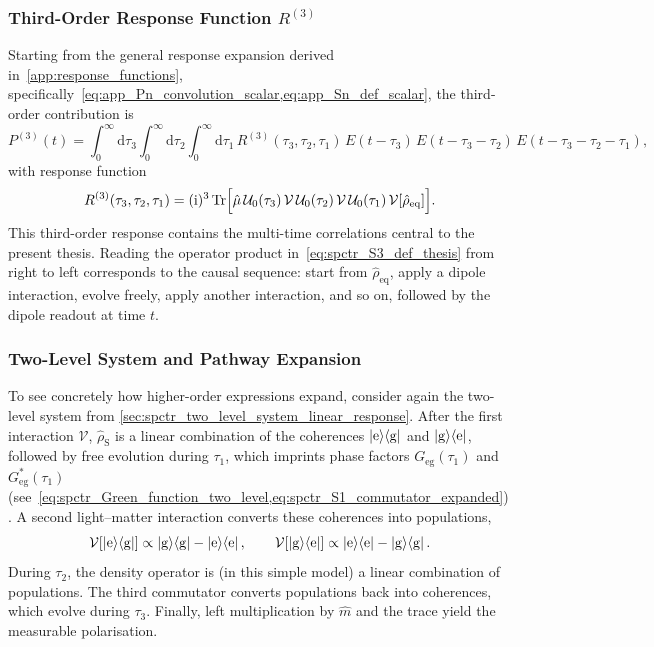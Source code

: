 \subsubsection{Third-Order Response Function \texorpdfstring{$R^{(3)}$}{R(3)}}
Starting from the general response expansion derived in~\autoref{app:response_functions}, specifically~\cref{eq:app_Pn_convolution_scalar,eq:app_Sn_def_scalar}, the third-order contribution is
\begin{equation}
\label{eq:spctr_P3_convolution_thesis}
P^{(3)}(t)
= \int_{0}^{\infty}\!\mathrm{d}\tau_3\int_{0}^{\infty}\!\mathrm{d}\tau_2\int_{0}^{\infty}\!\mathrm{d}\tau_1\,
R^{(3)}(\tau_3,\tau_2,\tau_1)\,
E(t-\tau_3)\,E(t-\tau_3-\tau_2)\,E(t-\tau_3-\tau_2-\tau_1),
\end{equation}
with response function
\begin{equation}
\label{eq:spctr_S3_def_thesis}
R^{(3)}(\tau_3,\tau_2,\tau_1)
= (\mathrm{i})^3\,\mathrm{Tr}\Bigl[\hat{\mu}\,\mathcal{U}_0(\tau_3)\,\mathcal{V}\,\mathcal{U}_0(\tau_2)\,\mathcal{V}\,\mathcal{U}_0(\tau_1)\,\mathcal{V}[\hat{\rho}_{\mathrm{eq}}]\Bigr].
\end{equation}
This third-order response contains the multi-time correlations central to the present thesis.
Reading the operator product in~\autoref{eq:spctr_S3_def_thesis} from right to left corresponds to the causal sequence: start from $\hat{\rho}_{\mathrm{eq}}$, apply a dipole interaction, evolve freely, apply another interaction, and so on, followed by the dipole readout at time $t$.

\subsubsection{Two-Level System and Pathway Expansion}
\label{sec:spctr_two_level_third_order_pathways}
To see concretely how higher-order expressions expand, consider again the two-level system from \autoref{sec:spctr_two_level_system_linear_response}.
After the first interaction $\mathcal{V}$, $\hat{\rho}_{\mathrm{S}}$ is a linear combination of the coherences $\ket{\mathrm{e}}\!\bra{\mathrm{g}}$ and $\ket{\mathrm{g}}\!\bra{\mathrm{e}}$, followed by free evolution during $\tau_1$, which imprints phase factors $G_{\mathrm{eg}}(\tau_1)$ and $G_{\mathrm{eg}}^*(\tau_1)$ (see~\autoref{eq:spctr_Green_function_two_level,eq:spctr_S1_commutator_expanded}).
A second light--matter interaction converts these coherences into populations,
\begin{equation*}
	\mathcal{V}[\ket{\mathrm{e}}\!\bra{\mathrm{g}}] \propto \ket{\mathrm{g}}\!\bra{\mathrm{g}} - \ket{\mathrm{e}}\!\bra{\mathrm{e}},
    \qquad
	\mathcal{V}[\ket{\mathrm{g}}\!\bra{\mathrm{e}}] \propto \ket{\mathrm{e}}\!\bra{\mathrm{e}} - \ket{\mathrm{g}}\!\bra{\mathrm{g}}.
\end{equation*}
During $\tau_2$, the density operator is (in this simple model) a linear combination of populations.
The third commutator converts populations back into coherences, which evolve during $\tau_3$.
Finally, left multiplication by $\hat{m}$ and the trace yield the measurable polarisation.

